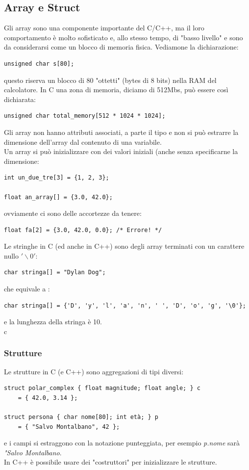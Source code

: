 \documentclass[a4paper,12pt, oneside]{book}
\begin{document}
	\subsection{Array e Struct}
	Gli array sono una componente importante del C/C++, ma il loro comportamento è molto sofisticato e, allo stesso tempo, di "basso livello" e sono da considerarsi come un blocco di memoria fisica. Vediamone la dichiarazione:
	\begin{verbatim}
unsigned char s[80];
\end{verbatim}
	questo riserva un blocco di 80 "ottetti" (bytes di 8 bits) nella RAM del calcolatore. In C una zona di memoria, diciamo di 512Mbs, può essere così dichiarata:
	\begin{verbatim}
unsigned char total_memory[512 * 1024 * 1024];
\end{verbatim}
	Gli array non hanno attributi associati, a parte il tipo e non si può estrarre la dimensione dell'array dal contenuto di una variabile.\\
	Un array si può inizializzare con dei valori iniziali (anche senza specificarne la dimensione:
	\begin{verbatim}
int un_due_tre[3] = {1, 2, 3};

float an_array[] = {3.0, 42.0};
\end{verbatim}
	ovviamente ci sono delle accortezze da tenere:
	\begin{verbatim}
float fa[2] = {3.0, 42.0, 0.0}; /* Errore! */
\end{verbatim}
	Le stringhe in C (ed anche in C++) sono degli array terminati
	con un carattere nullo $'\backslash 0'$:
	\begin{verbatim}
char stringa[] = "Dylan Dog";
\end{verbatim}
	che equivale a :
	\begin{verbatim}
char stringa[] = {'D', 'y', 'l', 'a', 'n', ' ', 'D', 'o', 'g', '\0'};
\end{verbatim}
	e la lunghezza della stringa è 10.\\c
	\subsubsection{Strutture}
	Le strutture in C (e C++) sono aggregazioni di tipi diversi:
	\begin{verbatim}
struct polar_complex { float magnitude; float angle; } c
    = { 42.0, 3.14 };

struct persona { char nome[80]; int età; } p
    = { "Salvo Montalbano", 42 };
\end{verbatim}
	e i campi si estraggono con la notazione punteggiata, per esempio \textit{p.nome} sarà \textit{"Salvo Montalbano}.\\
	In C++ è possibile usare dei "costruttori" per inizializzare le strutture.
\end{document}
